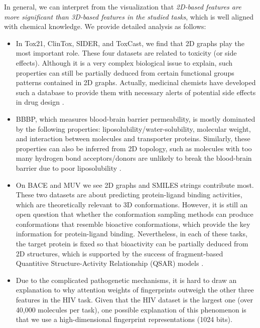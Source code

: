In general, we can interpret from the visualization that \emph{2D-based features are more significant than 3D-based features in the studied tasks}, which is well aligned with chemical knowledge. We provide detailed analysis as follows:
\begin{itemize}
\item In Tox21, ClinTox, SIDER, and ToxCast, we find that 2D graphs play the most important role. These four datasets are related to toxicity (or side effects). Although it is a very complex biological issue to explain, such properties can still be partially deduced from certain functional groups patterns contained in 2D graphs. Actually, medicinal chemists have developed such a database to provide them with necessary alerts of potential side effects in drug design \cite{Baell:2010ns}.
\item BBBP, which measures blood-brain barrier permeability, is mostly dominated by the following properties: liposolubility/water-solubility, molecular weight, and interaction between molecules and transporter proteins. Similarly, these properties can also be inferred from 2D topology, such as molecules with too many hydrogen bond acceptors/donors are unlikely to break the blood-brain barrier due to poor liposolubility \cite{Suckling:1986bb}.
\item On BACE and MUV we see 2D graphs and SMILES strings contribute most. These two datasets are about predicting protein-ligand binding activities, which are theoretically relevant to 3D conformations. However, it is still an open question that whether the conformation sampling methods can produce conformations that resemble bioactive conformations, which provide the key information for protein-ligand binding. Nevertheless, in each of these tasks, the target protein is fixed so that bioactivity can be partially deduced from 2D structures, which is supported by the success of fragment-based Quantitive Structure-Activity Relationship (QSAR) models \cite{Manoharan:2010qs}.
\item Due to the complicated pathogenetic mechanisms, it is hard to draw an explanation to why attention weights of fingerprints outweigh the other three features in the HIV task. Given that the HIV dataset is the largest one (over 40,000 molecules per task), one possible explanation of this phenomenon is that we use a high-dimensional fingerprint representations (1024 bits).
\end{itemize}

